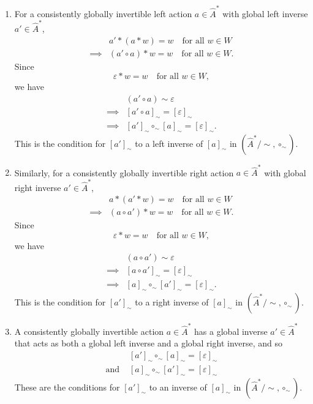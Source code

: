\begin{proofE}
\begin{enumerate}
    \item For a consistently globally invertible left action $a \in \hat{A}^{*}$ with global left inverse $a' \in \hat{A}^{*}$,
    \begin{align}
        & a' \ast (a \ast w) = w \quad \text{for all $w \in W$} \\
        \implies & (a' \circ a) \ast w = w \quad \text{for all $w \in W$}.
    \end{align}
    Since
    \begin{equation}
        \varepsilon \ast w = w \quad \text{for all $w \in W$},
    \end{equation}
    we have
    \begin{align}
        & (a' \circ a) \sim \varepsilon \\
        \implies & [a' \circ a]_{\sim} = [\varepsilon]_{\sim} \\
        \implies & [a']_{\sim} \circ_{\sim} [a]_{\sim} = [\varepsilon]_{\sim}.
    \end{align}
    This is the condition for $[a']_{\sim}$ to a left inverse of $[a]_{\sim}$ in $(\hat{A}^{*}/\sim, \circ_{\sim})$.

    \item Similarly, for a consistently globally invertible right action $a \in \hat{A}^{*}$ with global right inverse $a' \in \hat{A}^{*}$,
    \begin{align}
        & a \ast (a' \ast w) = w \quad \text{for all $w \in W$} \\
        \implies & (a \circ a') \ast w = w \quad \text{for all $w \in W$}.
    \end{align}
    Since
    \begin{equation}
        \varepsilon \ast w = w \quad \text{for all $w \in W$},
    \end{equation}
    we have
    \begin{align}
        & (a \circ a') \sim \varepsilon \\
        \implies & [a \circ a']_{\sim} = [\varepsilon]_{\sim} \\
        \implies & [a]_{\sim} \circ_{\sim} [a']_{\sim} = [\varepsilon]_{\sim}.
    \end{align}
    This is the condition for $[a']_{\sim}$ to a right inverse of $[a]_{\sim}$ in $(\hat{A}^{*}/\sim, \circ_{\sim})$.

    \item A consistently globally invertible action $a \in \hat{A}^{*}$ has a global inverse $a' \in \hat{A}^{*}$ that acts as both a global left inverse and a global right inverse, and so
    \begin{align}
        & [a']_{\sim} \circ_{\sim} [a]_{\sim} = [\varepsilon]_{\sim} \\
        \text{and } & [a]_{\sim} \circ_{\sim} [a']_{\sim} = [\varepsilon]_{\sim}
    \end{align}
    These are the conditions for $[a']_{\sim}$ to an inverse of $[a]_{\sim}$ in $(\hat{A}^{*}/\sim, \circ_{\sim})$.
\end{enumerate}
\end{proofE}

